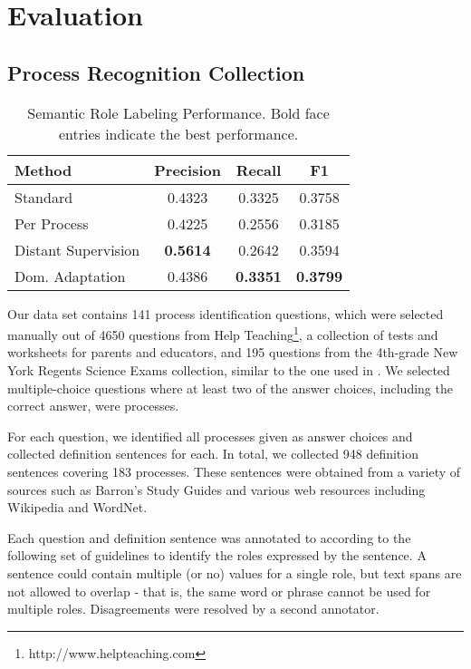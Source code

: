 \section{Evaluation}

\subsection{Process Recognition Collection}
\begin{table*}[htdp]
\begin{center}
\begin{tabular}{|l|c|c|c|}
\hline
Method			& 	Precision	&	Recall	&	F1\\
\hline
Standard			& 	0.4323	& 	0.3325	&	0.3758\\
Per Process		&	0.4225	& 	0.2556	& 	0.3185\\
Distant Supervision 	& 	{\bf 0.5614}	& 	0.2642	& 	0.3594 \\
Dom. Adaptation	& 	0.4386	& 	{\bf 0.3351}	& 	{\bf 0.3799}\\
\hline
\end{tabular}
\end{center}
\caption{Semantic Role Labeling Performance. Bold face entries indicate the best performance.}
\label{tab:srl-results}
\end{table*}%

Our data set contains 141 process identification questions, which were selected manually out of 4650 questions from Help Teaching\footnote{http://www.helpteaching.com}, a collection of tests and worksheets for parents and educators, and 195 questions from the 4th-grade New York Regents Science Exams collection, similar to the one used in \cite{clark2013study}. We selected multiple-choice questions where at least two of the answer choices, including the correct answer, were processes.

For each question, we identified all processes given as answer choices and collected definition sentences for each. In total, we collected 948 definition sentences covering 183 processes. These sentences were obtained from a variety of sources such as Barron's Study Guides and various web resources including Wikipedia and WordNet.

Each question and definition sentence was annotated to according to the following set of guidelines to identify the roles expressed by the sentence. A sentence could contain multiple (or no) values for a single role, but text spans are not allowed to overlap - that is, the same word or phrase cannot be used for multiple roles. Disagreements were resolved by a second annotator.

